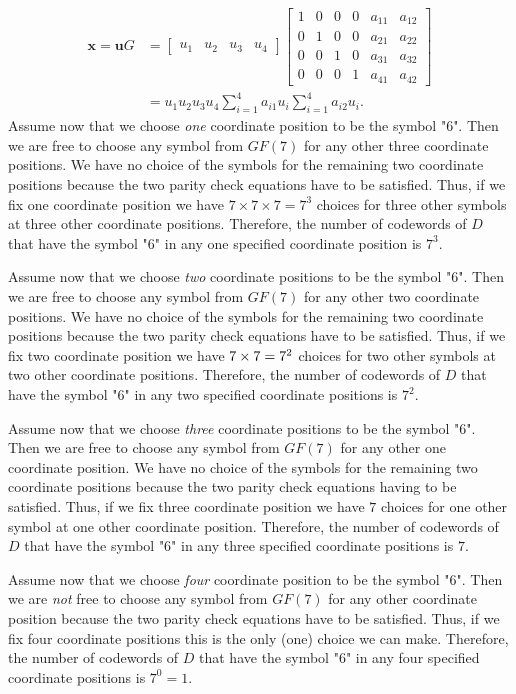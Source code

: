 \begin{align*}
\bm{x} = \bm{u}G &=
\begin{bmatrix}
  u_1 & u_2 & u_3 & u_4
\end{bmatrix}
\begin{bmatrix}
 1&   0&   0&   0&   a_{11}&   a_{12}\\
 0&   1&   0&   0&   a_{21}&   a_{22}\\
 0&   0&   1&   0&   a_{31}&   a_{32}\\
 0&   0&   0&   1&   a_{41}&   a_{42}
\end{bmatrix}\\
&=u_1 u_2 u_3 u_4 \sum_{i=1}^4 a_{i1}u_i  \sum_{i=1}^4 a_{i2}u_i.
\end{align*}
Assume now that we choose \textit{one} coordinate position to be the symbol "6". Then we are free to choose any symbol from $GF(7)$ for any other three coordinate positions.  We have no choice of the symbols for the remaining two coordinate positions because the two parity check equations have to be satisfied. Thus, if we fix one coordinate position we have $7\times7\times7=7^3$ choices for three other symbols at three other coordinate positions.  Therefore, the number of codewords of $D$ that have the symbol "6" in any one specified coordinate position is $7^3$.

Assume now that we choose \textit{two} coordinate positions to be the symbol "6". Then we are free to choose any symbol from $GF(7)$ for any other two coordinate positions.  We have no choice of the symbols for the remaining two coordinate positions because the two parity check equations have to be satisfied. Thus, if we fix two coordinate position we have $7\time7\times7=7^2$ choices for two other symbols at two other coordinate positions.  Therefore, the number of codewords of $D$ that have the symbol "6" in any two specified coordinate positions is $7^2$.

Assume now that we choose \textit{three} coordinate positions to be the symbol "6". Then we are free to choose any symbol from $GF(7)$ for any other one coordinate position.  We have no choice of the symbols for the remaining two coordinate positions because the two parity check equations having to be satisfied. Thus, if we fix three coordinate position we have $7$ choices for one other symbol at one other coordinate position.  Therefore, the number of codewords of $D$ that have the symbol "6" in any three specified coordinate positions is $7$.

Assume now that we choose \textit{four} coordinate position to be the symbol "6". Then we are \textit{not} free to choose any symbol from $GF(7)$ for any other coordinate position because the two parity check equations have to be satisfied. Thus, if we fix four coordinate positions this is the only (one) choice we can make.  Therefore, the number of codewords of $D$ that have the symbol "6" in any four specified coordinate positions is $7^0=1$.



